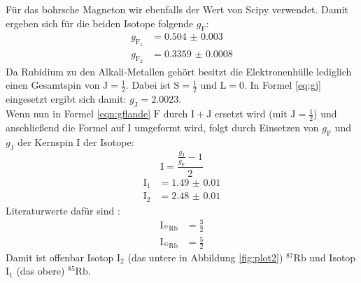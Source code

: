\documentclass[
  bibliography=totoc,     %
  captions=tableheading,  %
  titlepage=firstiscover, %
]{scrartcl}
\begin{document}
\noindent
Für das bohrsche Magneton wir ebenfalls der Wert von Scipy \cite{scipyconst} verwendet.
Damit ergeben sich für die beiden Isotope folgende $g_\mathup{F}$:
\begin{align*}
  g_{\mathup{F}_1} &= \num{0.504(3)}\\
  g_{\mathup{F}_2} &= \num{0.3359(8)}
\end{align*}
\noindent
Da Rubidium zu den Alkali-Metallen gehört besitzt die Elektronenhülle lediglich
einen Gesamtspin von $\mathup{J} = \frac{1}{2}$. Dabei ist $\mathup{S} = \frac{1}{2}$
und $\mathup{L} = 0$. In Formel \eqref{eq:gj} eingesetzt ergibt sich damit:
$g_\mathup{J} = \num{2.0023}$.\\
Wenn nun in Formel \eqref{eqn:gflande} $\mathup{F}$ durch $\mathup{I}+\mathup{J}$
ersetzt wird (mit $\mathup{J} = \frac{1}{2}$) und anschließend die Formel auf $\mathup{I}$ umgeformt wird,
folgt durch Einsetzen von $g_\mathup{F}$ und $g_\mathup{J}$ der Kernspin $\mathup{I}$
der Isotope:
\begin{equation}
  \mathup{I} = \frac{\frac{g_\mathup{J}}{g_\mathup{F}}-1}{2}
\end{equation}
\begin{align*}
  \mathup{I}_1 &= \num{1.49(1)}\\
  \mathup{I}_2 &= \num{2.48(1)}
\end{align*}
Literaturwerte dafür sind \cite{rubwi}:
\begin{align*}
  \mathup{I}_{^{87}\mathup{Rb}} &= \frac{3}{2}\\
  \mathup{I}_{^{85}\mathup{Rb}} &= \frac{5}{2}
\end{align*}
Damit ist offenbar Isotop $\mathup{I_2}$ (das untere in Abbildung \ref{fig:plot2}) $^{87}\mathup{Rb}$
und Isotop $\mathup{I_1}$ (das obere) $^{85}\mathup{Rb}$.
\end{document}
